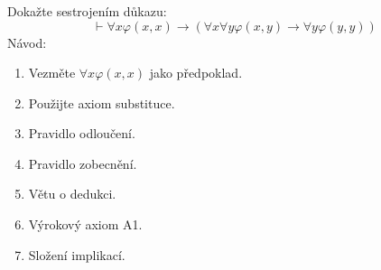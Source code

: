 \subsubsection{}
Dokažte sestrojením důkazu:
$$\vdash \forall x \varphi(x,x)\rightarrow(\forall x \forall y \varphi
(x,y)\rightarrow \forall y \varphi (y,y))$$
Návod:
\begin{enumerate}[(1)]
  \item Vezměte $\forall x \varphi(x,x)$ jako předpoklad.
  \item Použijte axiom substituce.
  \item Pravidlo odloučení.
  \item Pravidlo zobecnění.
  \item Větu o dedukci.
  \item Výrokový axiom A1.
  \item Složení implikací.
\end{enumerate}
